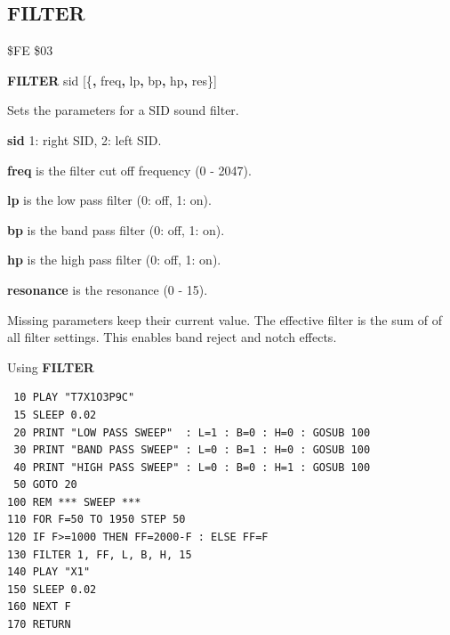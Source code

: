 \subsection{FILTER}
\begin{description}[leftmargin=2cm,style=nextline]
\item [Token:]    \$FE \$03

\item [Format:]   {\bf FILTER} sid [\{{\bf,} freq{\bf,} lp{\bf,} bp{\bf,} hp{\bf,} res\}]

\item [Usage:]    Sets the parameters for a SID sound filter.

                  {\bf sid} 1: right SID, 2: left SID.

                  {\bf freq} is the filter cut off frequency (0 - 2047).

                  {\bf lp} is the low pass filter (0: off, 1: on).

                  {\bf bp} is the band pass filter (0: off, 1: on).

                  {\bf hp} is the high pass filter (0: off, 1: on).

                  {\bf resonance} is the resonance (0 - 15).

\item [Remarks:]  Missing parameters keep their current value. The effective filter is the sum of of all filter settings. This enables band reject and notch effects.

\item [Example:]  Using {\bf FILTER}

\begin{tcolorbox}[colback=black,coltext=white]
\verbatimfont{\codefont}
\begin{verbatim}
 10 PLAY "T7X1O3P9C"
 15 SLEEP 0.02
 20 PRINT "LOW PASS SWEEP"  : L=1 : B=0 : H=0 : GOSUB 100
 30 PRINT "BAND PASS SWEEP" : L=0 : B=1 : H=0 : GOSUB 100
 40 PRINT "HIGH PASS SWEEP" : L=0 : B=0 : H=1 : GOSUB 100
 50 GOTO 20
100 REM *** SWEEP ***
110 FOR F=50 TO 1950 STEP 50
120 IF F>=1000 THEN FF=2000-F : ELSE FF=F
130 FILTER 1, FF, L, B, H, 15
140 PLAY "X1"
150 SLEEP 0.02
160 NEXT F
170 RETURN
\end{verbatim}
\end{tcolorbox}
\end{description}


\newpage
